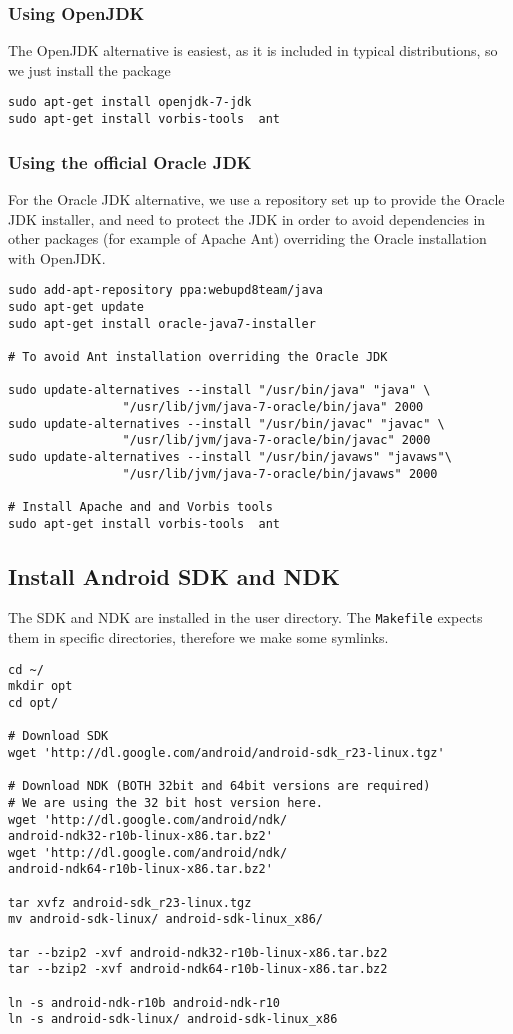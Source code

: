 \subsubsection{Using OpenJDK}
The OpenJDK alternative is easiest, as it is included in typical distributions, so we just install the package
\begin{verbatim}
sudo apt-get install openjdk-7-jdk
sudo apt-get install vorbis-tools  ant
\end{verbatim}

\subsubsection{Using the official Oracle JDK}
For the Oracle JDK alternative, we use a repository set up to provide the Oracle JDK installer, and need to protect the JDK in order to avoid dependencies in other packages (for example of Apache Ant) overriding the Oracle installation with OpenJDK.

\begin{verbatim}
sudo add-apt-repository ppa:webupd8team/java
sudo apt-get update
sudo apt-get install oracle-java7-installer

# To avoid Ant installation overriding the Oracle JDK

sudo update-alternatives --install "/usr/bin/java" "java" \
                "/usr/lib/jvm/java-7-oracle/bin/java" 2000
sudo update-alternatives --install "/usr/bin/javac" "javac" \
                "/usr/lib/jvm/java-7-oracle/bin/javac" 2000
sudo update-alternatives --install "/usr/bin/javaws" "javaws"\
                "/usr/lib/jvm/java-7-oracle/bin/javaws" 2000

# Install Apache and and Vorbis tools
sudo apt-get install vorbis-tools  ant
\end{verbatim}


\subsection{Install Android SDK and NDK}

The SDK and NDK are installed in the user directory. The \texttt{Makefile} expects them in specific directories, therefore we make some symlinks.

\begin{verbatim}
cd ~/
mkdir opt
cd opt/

# Download SDK
wget 'http://dl.google.com/android/android-sdk_r23-linux.tgz'

# Download NDK (BOTH 32bit and 64bit versions are required)
# We are using the 32 bit host version here.
wget 'http://dl.google.com/android/ndk/
android-ndk32-r10b-linux-x86.tar.bz2'
wget 'http://dl.google.com/android/ndk/
android-ndk64-r10b-linux-x86.tar.bz2'
        
tar xvfz android-sdk_r23-linux.tgz
mv android-sdk-linux/ android-sdk-linux_x86/

tar --bzip2 -xvf android-ndk32-r10b-linux-x86.tar.bz2
tar --bzip2 -xvf android-ndk64-r10b-linux-x86.tar.bz2

ln -s android-ndk-r10b android-ndk-r10
ln -s android-sdk-linux/ android-sdk-linux_x86
\end{verbatim}

